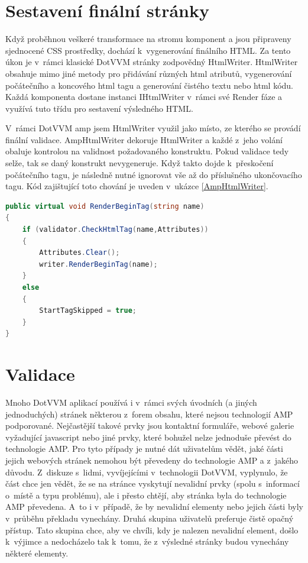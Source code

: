 \section{Sestavení finální stránky}
Když proběhnou veškeré transformace na stromu komponent a jsou připraveny sjednocené CSS prostředky, dochází k~vygenerování finálního HTML. Za tento úkon je v~rámci klasické DotVVM stránky zodpovědný HtmlWriter. HtmlWriter obsahuje mimo jiné metody pro přidávání různých html atributů, vygenerování počátečního a koncového html tagu a generování čistého textu nebo html kódu. Každá komponenta dostane instanci IHtmlWriter v~rámci své Render fáze a využívá tuto třídu pro sestavení výsledného HTML.

V~rámci DotVVM amp jsem HtmlWriter využil jako místo, ze kterého se provádí finální validace. AmpHtmlWriter dekoruje HtmlWriter a každé z~jeho volání obaluje kontrolou na validnost požadovaného konstruktu. Pokud validace tedy selže, tak se daný konstrukt nevygeneruje. Když takto dojde k~přeskočení počátečního tagu, je následně nutné ignorovat vše až do příslušného ukončovacího tagu. Kód zajištující toto chování je uveden v~ukázce \ref{AmpHtmlWriter}.


\begin{lstlisting}[language=c#, caption=Metoda RenderBeginTag na třídě AmpHtmlWriter ,label=AmpHtmlWriter,captionpos=t]
public virtual void RenderBeginTag(string name)
{
    if (validator.CheckHtmlTag(name,Attributes))
    {
        Attributes.Clear();
        writer.RenderBeginTag(name);
    }
    else
    {
        StartTagSkipped = true;
    }
}
\end{lstlisting}

\section{Validace}
Mnoho DotVVM aplikací používá i v~rámci svých úvodních (a jiných jednoduchých) stránek některou z~forem obsahu, které nejsou technologií AMP podporované. Nejčastější takové prvky jsou kontaktní formuláře, webové galerie vyžadující javascript nebo jiné prvky, které bohužel nelze jednoduše převést do technologie AMP.
Pro tyto případy je nutné dát uživatelům vědět, jaké části jejich webových stránek nemohou být převedeny do technologie AMP a z~jakého důvodu. Z~diskuze s~lidmi, vyvíjejícími v~technologii DotVVM, vyplynulo, že část chce jen vědět, že se na stránce vyskytují nevalidní prvky (spolu s~informací o~místě a typu problému), ale i přesto chtějí, aby stránka byla do technologie AMP převedena. A~to i v~případě, že by nevalidní elementy nebo jejich části byly v~průběhu překladu vynechány. Druhá skupina uživatelů preferuje čistě opačný přístup. Tato skupina chce, aby ve chvíli, kdy je nalezen nevalidní element, došlo k~výjimce a nedocházelo tak k~tomu, že z~výsledné stránky budou vynechány některé elementy.

